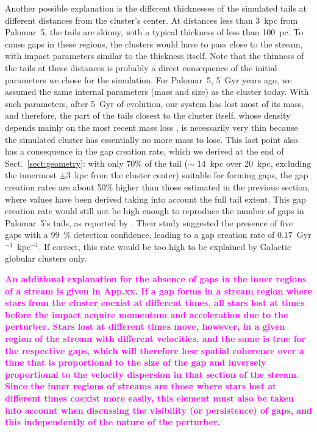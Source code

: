 \documentclass{aa}
\newcommand{\paola}[1]{\textcolor{magenta}{{#1}}}
\begin{document}
    Another possible explanation is the different thicknesses of the simulated tails at different distances from the cluster's center. At distances less than 3~kpc from Palomar~5, the tails are skinny, with a typical thickness of less than 100~pc. To cause gaps in these regions, the clusters would have to pass close to the stream, with impact parameters similar to the thickness itself. Note that the thinness of the tails at these distances is probably a direct consequence of the initial parameters we chose for the simulation. For Palomar~5, 5~Gyr years ago, we assumed the same internal parameters (mass and size) as the cluster today. With such parameters, after 5~Gyr of evolution, our system has lost most of its mass, and therefore, the part of the tails closest to the cluster itself, whose density depends mainly on the most recent mass loss \citep[see, for example, Fig.~A.3 in][]{2012A&A...546L...7M}, is necessarily very thin because the simulated cluster has essentially no more mass to lose. This last point also has a consequence in the gap creation rate, which we derived at the end of Sect.~\ref{sect:geometry}: with only 70\% of the tail  ($\sim$ 14~kpc over 20~kpc, excluding the innermost $\pm 3$~kpc from the cluster center) suitable for forming gaps, the gap creation rates are about 50$\%$ higher than those estimated in the previous section, where values have been derived taking into account the full tail extent. This gap creation rate would still not be high enough to reproduce the number of gaps in Palomar~5's tails, as reported by \citet{2012ApJ...760...75C}. Their study suggested the presence of five gaps with a 99~\% detection confidence, leading to a gap creation rate of 0.17~Gyr$^{-1}$~kpc$^{-1}$. If correct, this rate would be too high to be explained by Galactic globular clusters only. 

\textbf{\paola{An additional explanation for the absence of gaps in the inner regions of a stream is given in App.xx. If a gap forms in a stream region where stars from the cluster coexist at different times, all stars lost at times before the impact acquire momentum and acceleration due to the perturber. Stars lost at different times move, however, in a given region of the stream with different velocities, and the same is true for the respective gaps, which will therefore lose spatial coherence over a time that is proportional to the size of the gap and inversely proportional to the velocity dispersion in that section of the stream. Since the inner regions of streams are those where stars lost at different times coexist more easily, this element must also be taken into account when discussing the visibility (or persistence) of gaps, and this independently of the nature of the perturber.}}
\end{document}

